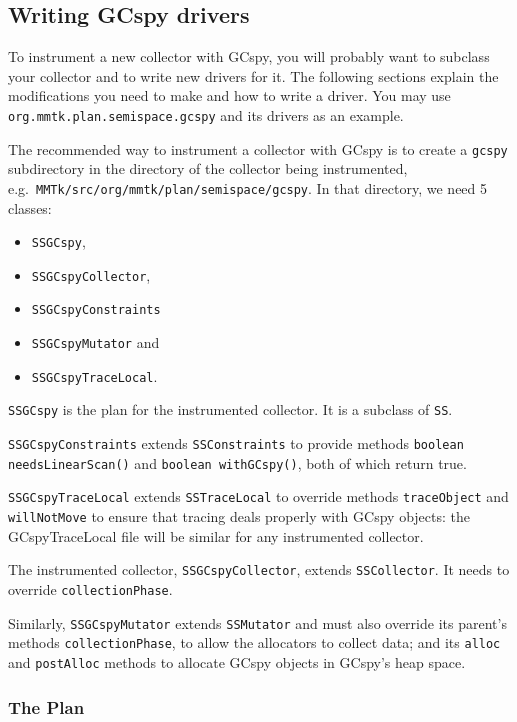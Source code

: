 \subsection{Writing GCspy drivers}

To instrument a new collector with GCspy, you will probably want to subclass your 
collector and to write new drivers for it. 
The following sections explain the modifications you need to make
and how to write a driver. You may use \texttt{org.mmtk.plan.semispace.gcspy} and its
drivers as an example.


The recommended way to instrument a \jrvm{} collector with GCspy is to
create a \texttt{gcspy} subdirectory in the directory of the collector being instrumented,
e.g.\ \texttt{MMTk/src/org/mmtk/plan/semispace/gcspy}. 
In that directory, we need 5 classes:
\begin{itemize}
\item \texttt{SSGCspy},
\item \texttt{SSGCspyCollector},
\item \texttt{SSGCspyConstraints} 
\item \texttt{SSGCspyMutator} and
\item \texttt{SSGCspyTraceLocal}.
\end{itemize}

\texttt{SSGCspy} is the plan for the instrumented collector. It is a 
subclass of \texttt{SS}.

\texttt{SSGCspyConstraints} extends \texttt{SSConstraints} to provide methods
\texttt{boolean needsLinearScan()} and \texttt{boolean withGCspy()}, both
of which return true.

\texttt{SSGCspyTraceLocal} extends \texttt{SSTraceLocal} to override methods
\texttt{traceObject} and 
\texttt{willNotMove}
to ensure that tracing 
deals properly with GCspy objects: the GCspyTraceLocal file will be similar for 
any instrumented collector.

The instrumented collector, \texttt{SSGCspyCollector}, extends \texttt{SSCollector}.
It needs to override \texttt{collectionPhase}.

Similarly, \texttt{SSGCspyMutator} extends \texttt{SSMutator} and must also override its 
parent's methods
\texttt{collectionPhase}, to
allow the allocators to collect data;
and its \texttt{alloc} and \texttt{postAlloc} methods to allocate GCspy objects in GCspy's
heap space.


   
\subsubsection{The Plan}

